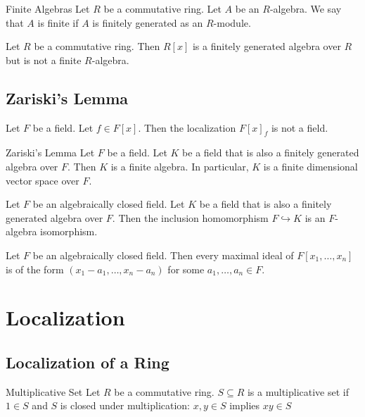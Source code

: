 \documentclass[a4paper]{article}
\begin{document}
\begin{defn}{Finite Algebras}{} Let $R$ be a commutative ring. Let $A$ be an $R$-algebra. We say that $A$ is finite if $A$ is finitely generated as an $R$-module. 
\end{defn}

\begin{eg}{}{} Let $R$ be a commutative ring. Then $R[x]$ is a finitely generated algebra over $R$ but is not a finite $R$-algebra. 
\end{eg}

\subsection{Zariski's Lemma}
\begin{lmm}{}{} Let $F$ be a field. Let $f\in F[x]$. Then the localization $F[x]_f$ is not a field. 
\end{lmm}

\begin{thm}{Zariski's Lemma}{} Let $F$ be a field. Let $K$ be a field that is also a finitely generated algebra over $F$. Then $K$ is a finite algebra. In particular, $K$ is a finite dimensional vector space over $F$. 
\end{thm}

\begin{crl}{}{} Let $F$ be an algebraically closed field. Let $K$ be a field that is also a finitely generated algebra over $F$. Then the inclusion homomorphism $F\hookrightarrow K$ is an $F$-algebra isomorphism. 
\end{crl}

\begin{crl}{}{} Let $F$ be an algebraically closed field. Then every maximal ideal of $F[x_1,\dots,x_n]$ is of the form $(x_1-a_1,\dots,x_n-a_n)$ for some $a_1,\dots,a_n\in F$. 
\end{crl}

\pagebreak
\section{Localization}
\subsection{Localization of a Ring}
\begin{defn}{Multiplicative Set}{} Let $R$ be a commutative ring. $S\subseteq R$ is a multiplicative set if $1\in S$ and $S$ is closed under multiplication: $x,y\in S$ implies $xy\in S$
\end{defn}
\end{document}
